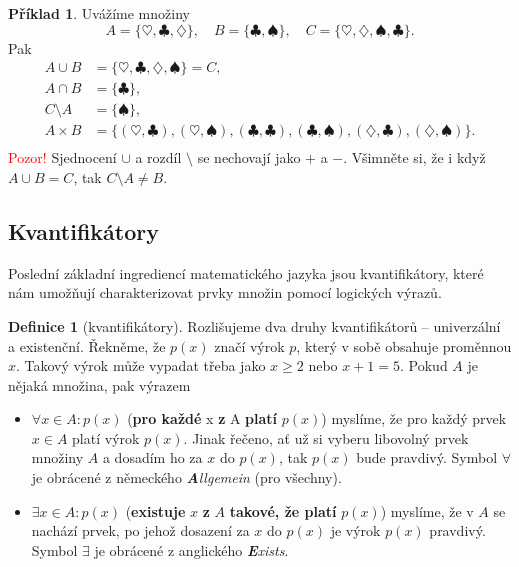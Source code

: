 \documentclass[a4paper,11pt]{article}
\theoremstyle{definition}
\newtheorem{exm}[thm]{Příklad}
\newtheorem{dfn}[thm]{Definice}
\theoremstyle{plain}
\begin{document}
\begin{exm}
 Uvážíme množiny
 \[
  A = \{\heartsuit, \clubsuit, \diamondsuit \}, \quad B = \{ \clubsuit,
  \spadesuit \}, \quad C = \{\heartsuit, \diamondsuit, \spadesuit, \clubsuit\}.
 \]
 Pak
 \begin{align*}
  A \cup B &= \{\heartsuit, \clubsuit, \diamondsuit, \spadesuit\} = C, \\
  A \cap B &= \{\clubsuit\}, \\
  C \setminus A &= \{\spadesuit\}, \\
  A \times B &= \{(\heartsuit, \clubsuit), (\heartsuit, \spadesuit), (\clubsuit,
  \clubsuit), (\clubsuit, \spadesuit), (\diamondsuit, \clubsuit),
  (\diamondsuit, \spadesuit)\}. \\
 \end{align*}
 \textcolor{red}{Pozor!} Sjednocení $ \cup $ a rozdíl $ \setminus $ se nechovají
 jako $+$ a $-$. Všimněte si, že i když $A \cup B = C$, tak $C \setminus A \neq
 B$.
\end{exm}

\subsection{Kvantifikátory}
\label{ssec:kvantifikatory}

Poslední základní ingrediencí matematického jazyka jsou kvantifikátory, které
nám umožňují charakterizovat prvky množin pomocí logických výrazů.

\begin{dfn}[kvantifikátory]
 Rozlišujeme dva druhy kvantifikátorů -- univerzální a existenční. Řekněme, že
 $p(x)$ značí výrok $p$, který v sobě obsahuje proměnnou $x$. Takový výrok může
 vypadat třeba jako $x \geq 2$ nebo $x + 1 = 5$. Pokud $A$ je nějaká množina,
 pak výrazem
 \begin{itemize}
  \item $ \forall x \in A: p(x)$ (\textbf{pro každé} x \textbf{z} A
   \textbf{platí} $p(x)$) myslíme, že pro každý prvek $x \in A$ platí výrok
   $p(x)$. Jinak řečeno, ať už si vyberu libovolný prvek množiny $A$ a dosadím
   ho za $x$ do $p(x)$, tak $p(x)$ bude pravdivý. Symbol $ \forall $ je obrácené
    z německého \emph{\textbf{A}llgemein} (pro všechny).
  \item $ \exists x \in A: p(x)$ (\textbf{existuje} $x$ \textbf{z} $A$
   \textbf{takové, že platí} $p(x)$) myslíme, že v $A$ se nachází prvek, po
   jehož dosazení za $x$ do $p(x)$ je výrok $p(x)$ pravdivý. Symbol $ \exists $
   je obrácené  z anglického \emph{\textbf{E}xists}.
 \end{itemize}
\end{dfn}
\end{document}
